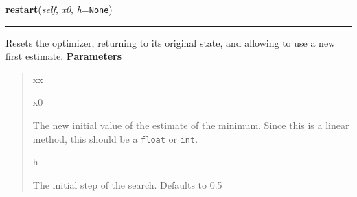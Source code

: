     \label{peach:optm:linear:Direct1D:restart}

    \vspace{0.5ex}

\hspace{.8\funcindent}\begin{boxedminipage}{\funcwidth}

    \raggedright \textbf{restart}(\textit{self}, \textit{x0}, \textit{h}={\tt None})

    \vspace{-1.5ex}

    \rule{\textwidth}{0.5\fboxrule}
\setlength{\parskip}{2ex}

Resets the optimizer, returning to its original state, and allowing to
use a new first estimate.
\setlength{\parskip}{1ex}
      \textbf{Parameters}
      \vspace{-1ex}

      \begin{quote}
        \begin{Ventry}{xx}

          \item[x0]


The new initial value of the estimate of the minimum. Since this is
a linear method, this should be a \texttt{float} or \texttt{int}.
          \item[h]


The initial step of the search. Defaults to 0.5
        \end{Ventry}

      \end{quote}

    \end{boxedminipage}

    \vspace{0.5ex}

